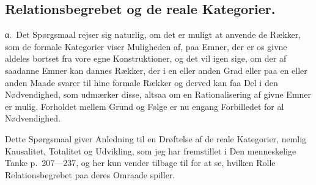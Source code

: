 \documentclass[12pt]{article}
\begin{document}
\subsection{Relationsbegrebet og de reale Kategorier.}
\label{sec:3c}

%
\label{sec:3c-alpha}%
α.~Det Spørgsmaal rejser sig naturlig, om det er muligt at anvende de
Rækker, som de formale Kategorier viser Muligheden af, paa Emner, der er
os givne aldeles bortset fra vore egne Konstruktioner, og det vil igen
sige, om der af saadanne Emner kan dannes Rækker, der i en eller anden
Grad eller paa en eller anden Maade svarer til hine formale Rækker og
derved kan faa Del i den Nødvendighed, som udmærker disse, altsaa om en
Rationalisering af givne Emner er mulig. Forholdet mellem Grund og Følge
er nu engang Forbilledet for al Nødvendighed.

Dette Spørgsmaal giver Anledning til en Drøftelse af de reale
Kategorier, nemlig Kausalitet, Totalitet og Udvikling, som jeg har
fremstillet i \guillemotright Den menneskelige Tanke\guillemotleft{}
p.~207---237, og her kun vender tilbage til for at se, hvilken Rolle
Relationsbegrebet paa deres Omraade spiller.
\end{document}
